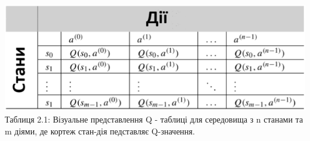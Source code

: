 \begin{center}
  \includegraphics[scale = 1]{Pictures/QTable.png}\\
  Таблиця 2.1: Візуальне представлення Q - таблиці для середовища з \newline n станами та m діями, 
  де кортеж стан-дія педставляє Q-значення.\\
\end{center}

